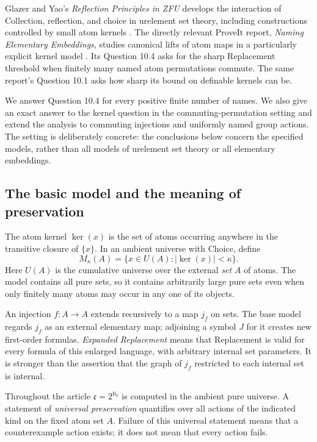 \documentclass[11pt,letterpaper]{article}
\numberwithin{equation}{section}
\theoremstyle{plain}
\theoremstyle{definition}
\theoremstyle{remark}
\newcommand{\kerat}{\operatorname{ker}}
\newcommand{\cont}{\mathfrak c}
\newcommand{\Mk}{M_\kappa(A)}
\begin{document}
Glazer and Yao's \emph{Reflection Principles in ZFU} develops the interaction of Collection, reflection, and choice in urelement set theory, including constructions controlled by small atom kernels \cite{GY2026}. The directly relevant ProveIt report, \emph{Naming Elementary Embeddings}, studies canonical lifts of atom maps in a particularly explicit kernel model \cite{RepoNaming}. Its Question 10.4 asks for the sharp Replacement threshold when finitely many named atom permutations commute. The same report's Question 10.1 asks how sharp its bound on definable kernels can be.

We answer Question 10.4 for every positive finite number of names. We also give an exact answer to the kernel question in the commuting-permutation setting and extend the analysis to commuting injections and uniformly named group actions. The setting is deliberately concrete: the conclusions below concern the specified models, rather than all models of urelement set theory or all elementary embeddings.

\subsection{The basic model and the meaning of preservation}

The atom kernel $\kerat(x)$ is the set of atoms occurring anywhere in the transitive closure of $\{x\}$. In an ambient universe with Choice, define
\begin{equation}\label{nee:ca:eq:model-intro}
\Mk=\{x\in U(A):|\kerat(x)|<\kappa\}.
\end{equation}
Here $U(A)$ is the cumulative universe over the external \emph{set} $A$ of atoms. The model contains all pure sets, so it contains arbitrarily large pure sets even when only finitely many atoms may occur in any one of its objects.

An injection $f:A\to A$ extends recursively to a map $j_f$ on sets. The base model regards $j_f$ as an external elementary map; adjoining a symbol $J$ for it creates new first-order formulas. \emph{Expanded Replacement} means that Replacement is valid for every formula of this enlarged language, with arbitrary internal set parameters. It is stronger than the assertion that the graph of $j_f$ restricted to each internal set is internal.

Throughout the article $\cont=2^{\aleph_0}$ is computed in the ambient pure universe. A statement of \emph{universal preservation} quantifies over all actions of the indicated kind on the fixed atom set $A$. Failure of this universal statement means that a counterexample action exists; it does not mean that every action fails.
\end{document}
